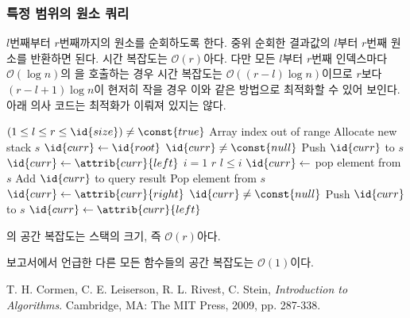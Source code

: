 \subsubsection{특정 범위의 원소 쿼리} $l$번째부터 $r$번째까지의 원소를 순회하도록 한다. 중위 순회한 결과값의 $l$부터 $r$번째 원소를
반환하면 된다. 시간 복잡도는 $\mathcal{O}\left(r\right)$아다. 다만 모든 $l$부터 $r$번째 인덱스마다 $\mathcal{O}\left(\log n\right)$의
을 호출하는 경우 시간 복잡도는 $\mathcal{O}\left(\left(r - l\right) \log n\right)$이므로
$r$보다 $\left(r - l + 1\right) \log n$이 현저히 작을 경우 이와 같은 방법으로 최적화할 수 있어 보인다.
아래 의사 코드는 최적화가 이뤄져 있지는 않다.

\begin{codebox}
\li \If $(1 \leq l \leq r \leq \id{size}) \neq \const{true}$ \Then
\li     \Error Array index out of range
    \End
\li Allocate new stack $s$
\li $\id{curr} \gets \id{root}$
\li \While $\id{curr} \neq \const{null}$ \Do
\li     Push $\id{curr}$ to $s$
\li     $\id{curr} \gets \attrib{curr}{left}$
    \End
\li \For $i = 1$ \To $r$ \Do
\li     \If $l \leq i$ \Then
\li         $\id{curr} \gets $ pop element from $s$
\li         Add $\id{curr}$ to query result
\li     \ElseNoIf
\li         Pop element from $s$
        \End
\li     $\id{curr} \gets \attrib{curr}{right}$
\li     \While $\id{curr} \neq \const{null}$ \Do
\li         Push $\id{curr}$ to $s$
\li         $\id{curr} \gets \attrib{curr}{left}$
        \End
    \End
\end{codebox}

의 공간 복잡도는 스택의 크기, 즉 $\mathcal{O}\left(r\right)$아다.

보고서에서 언급한 다른 모든 함수들의 공간 복잡도는 $\mathcal{O}\left(1\right)$이다.

\begin{thebibliography}{1}
     T. H. Cormen, C. E. Leiserson, R. L. Rivest, C. Stein, \textit{Introduction
    to Algorithms}. Cambridge, MA: The MIT Press, 2009, pp. 287-338.
\end{thebibliography}


